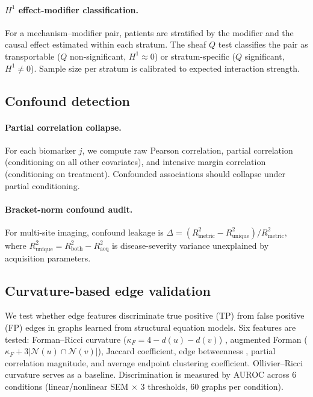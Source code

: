 \documentclass{article}
\begin{document}
\paragraph{$H^1$ effect-modifier classification.}
For a mechanism--modifier pair, patients are stratified by the modifier and the causal effect estimated within each stratum.
The sheaf $Q$ test classifies the pair as transportable ($Q$ non-significant, $H^1 \approx 0$) or stratum-specific ($Q$ significant, $H^1 \neq 0$).
Sample size per stratum is calibrated to expected interaction strength.

\subsection{Confound detection}
\label{sec:meth-confound}

\paragraph{Partial correlation collapse.}
For each biomarker $j$, we compute raw Pearson correlation, partial correlation (conditioning on all other covariates), and intensive margin correlation (conditioning on treatment).
Confounded associations should collapse under partial conditioning.

\paragraph{Bracket-norm confound audit.}
For multi-site imaging, confound leakage is $\Delta = (R^2_{\mathrm{metric}} - R^2_{\mathrm{unique}}) / R^2_{\mathrm{metric}}$, where $R^2_{\mathrm{unique}} = R^2_{\mathrm{both}} - R^2_{\mathrm{acq}}$ is disease-severity variance unexplained by acquisition parameters.

\subsection{Curvature-based edge validation}
\label{sec:meth-curvature}

We test whether edge features discriminate true positive (TP) from false positive (FP) edges in graphs learned from structural equation models.
Six features are tested: Forman--Ricci curvature ($\kappa_F = 4 - d(u) - d(v)$) \citep{forman2003bochner}, augmented Forman ($\kappa_F + 3|\mathcal{N}(u) \cap \mathcal{N}(v)|$), Jaccard coefficient, edge betweenness \citep{girvan2002community}, partial correlation magnitude, and average endpoint clustering coefficient.
Ollivier--Ricci curvature \citep{ollivier2009ricci, ni2019community} serves as a baseline.
Discrimination is measured by AUROC across 6 conditions (linear/nonlinear SEM $\times$ 3 thresholds, 60 graphs per condition).
\end{document}
